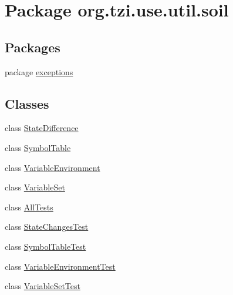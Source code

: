 \hypertarget{namespaceorg_1_1tzi_1_1use_1_1util_1_1soil}{\section{Package org.\-tzi.\-use.\-util.\-soil}
\label{namespaceorg_1_1tzi_1_1use_1_1util_1_1soil}
}
\subsection*{Packages}
\begin{DoxyCompactItemize}
\item 
package \hyperlink{namespaceorg_1_1tzi_1_1use_1_1util_1_1soil_1_1exceptions}{exceptions}
\end{DoxyCompactItemize}
\subsection*{Classes}
\begin{DoxyCompactItemize}
\item 
class \hyperlink{classorg_1_1tzi_1_1use_1_1util_1_1soil_1_1_state_difference}{State\-Difference}
\item 
class \hyperlink{classorg_1_1tzi_1_1use_1_1util_1_1soil_1_1_symbol_table}{Symbol\-Table}
\item 
class \hyperlink{classorg_1_1tzi_1_1use_1_1util_1_1soil_1_1_variable_environment}{Variable\-Environment}
\item 
class \hyperlink{classorg_1_1tzi_1_1use_1_1util_1_1soil_1_1_variable_set}{Variable\-Set}
\item 
class \hyperlink{classorg_1_1tzi_1_1use_1_1util_1_1soil_1_1_all_tests}{All\-Tests}
\item 
class \hyperlink{classorg_1_1tzi_1_1use_1_1util_1_1soil_1_1_state_changes_test}{State\-Changes\-Test}
\item 
class \hyperlink{classorg_1_1tzi_1_1use_1_1util_1_1soil_1_1_symbol_table_test}{Symbol\-Table\-Test}
\item 
class \hyperlink{classorg_1_1tzi_1_1use_1_1util_1_1soil_1_1_variable_environment_test}{Variable\-Environment\-Test}
\item 
class \hyperlink{classorg_1_1tzi_1_1use_1_1util_1_1soil_1_1_variable_set_test}{Variable\-Set\-Test}
\end{DoxyCompactItemize}
